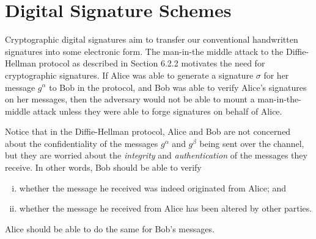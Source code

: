 \section{Digital Signature Schemes}
Cryptographic digital signatures aim to transfer our conventional handwritten 
signatures into some electronic form. The man-in-the middle attack to the 
Diffie-Hellman protocol as described in Section 6.2.2 motivates the need for 
cryptographic signatures. If Alice was able to generate a signature $\sigma$ 
for her message $g^\alpha$ to Bob in the protocol, and Bob was able to 
verify Alice's signatures on her messages, then the adversary would not be 
able to mount a man-in-the-middle attack unless they were able to forge 
signatures on behalf of Alice. 

Notice that in the Diffie-Hellman protocol, Alice and Bob are not concerned 
about the confidentiality of the messages $g^\alpha$ and $g^\beta$ being 
sent over the channel, but they are worried about the \emph{integrity} and 
\emph{authentication} of the messages they receive. In other words, Bob 
should be able to verify 
\begin{enumerate}[(i)]
    \item whether the message he received was indeed originated from Alice; and 
    \item whether the message he received from Alice has been altered by 
          other parties.
\end{enumerate}
Alice should be able to do the same for Bob's messages. 

